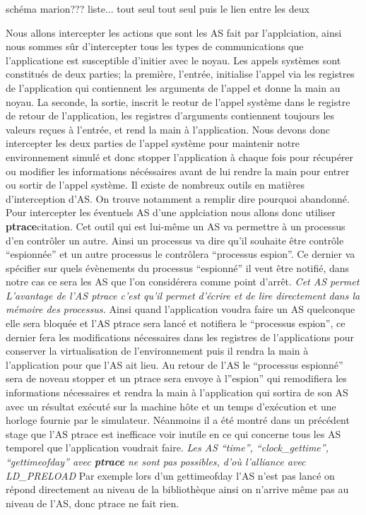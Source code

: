 {\color{red} schéma marion???} liste... tout seul tout seul puis le lien entre
les deux

Nous allons intercepter les actions que sont les AS fait par l'applciation, ainsi
nous sommes sûr d'intercepter tous les types de communications que
l'applicatione est susceptible d'initier avec le noyau. Les appels systèmes sont constitués de deux parties; la première, l'entrée, initialise l'appel via les registres de l'application qui contiennent les arguments de l'appel et donne la main au noyau. La seconde, la sortie, inscrit le reotur de l'appel système dans le registre de retour de l'application, les registres d'arguments contiennent toujours les valeurs reçues à l'entrée, et rend la main à l'application. Nous devons donc intercepter les deux parties de l'appel système pour maintenir notre environnement simulé et donc stopper l'application à chaque fois pour récupérer ou modifier les informations nécéssaires avant de lui rendre la main pour entrer ou sortir de l'appel système. Il existe de nombreux outils
en matières d'interception d'AS. On trouve notamment {\color{green} a remplir
  dire pourquoi abandonné}. Pour intercepter les éventuels AS d'une applciation
nous allons donc utiliser \textbf{ptrace}{\color{red}citation}. Cet outil qui
est lui-même un AS va permettre à un processus d'en contrôler un autre. Ainsi un
processus va dire qu'il souhaite être contrôle ``espionnée'' et un autre
processus le contrôlera ``processus espion''. Ce dernier va spécifier sur quels
évènements du processus ``espionné'' il veut être notifié, dans notre cas ce
sera les AS que l'on considérera comme point d'arrêt. \textit{Cet AS permet
  L'avantage de l'AS ptrace c'est qu'il permet d'écrire et de lire directement
  dans la mémoire des processus.} Ainsi quand l'application voudra faire un AS
quelconque elle sera bloquée et l'AS ptrace sera lancé et notifiera le
``processus espion'', ce dernier fera les modifications nécessaires dans les
registres de l'applications pour conserver la virtualisation de l'environnement
puis il rendra la main à l'application pour que l'AS ait lieu. Au retour de l'AS
le ``processus espionné'' sera de noveau stopper et un ptrace sera envoye à
l''espion'' qui remodifiera les informations nécessaires et rendra la main à
l'application qui sortira de son AS avec un résultat exécuté sur la machine hôte
et un temps d'exécution et une horloge fournie par le simulateur. Néanmoins il a
été montré dans un précédent stage que l'AS ptrace est inefficace voir inutile
en ce qui concerne tous les AS temporel que l'application voudrait
faire. \textit{Les AS ``time'', ``clock\_gettime'', ``gettimeofday'' avec
  \textbf{ptrace} ne sont pas possibles, d'où l'alliance avec LD\_PRELOAD} Par
exemple lors d'un gettimeofday l'AS n'est pas lancé on répond directement au
niveau de la bibliothèque ainsi on n'arrive même pas au niveau de l'AS, donc
ptrace ne fait rien.

